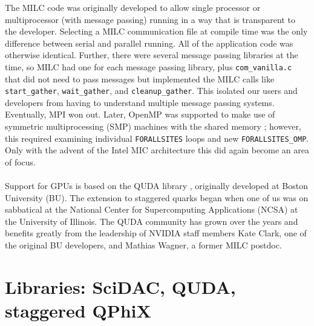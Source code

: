 \documentclass[epj]{webofc}
\begin{document}
The MILC code was originally developed to allow single processor or
multiprocessor (with message passing) running in a way that is transparent
to the developer.  Selecting a MILC communication file at compile time
was the only difference between serial and parallel running.  All of
the application code was otherwise identical.  Further, there were several
message passing libraries at the time, so MILC had one for each message
passing library, plus {\tt com\_vanilla.c} that did not need to pass messages
but implemented the MILC calls like {\tt start\_gather}, {\tt wait\_gather}, and 
{\tt cleanup\_gather}.  This isolated our users and developers from having to
understand multiple message passing systems.  Eventually, MPI won out.
Later, OpenMP was supported to make use of 
symmetric multiprocessing (SMP) machines with the shared memory \cite{MILCwMPI}; 
however, this required examining individual {\tt FORALLSITES} loops and new
{\tt FORALLSITES\_OMP}.  Only with the advent of the Intel MIC architecture
this did again become an area of focus.\\
\\
Support for GPUs is based on the QUDA library \cite{QUDA}, originally developed at
Boston University (BU).  The extension to staggered quarks began when one of us
was on sabbatical at the National Center for Supercomputing Applications
(NCSA) at the University of Illinois.  The QUDA community has grown over 
the years and benefits greatly from the leadership of NVIDIA
staff members Kate Clark, one of the original BU developers, and Mathias Wagner,
a former MILC postdoc.


\section{Libraries: SciDAC, QUDA, staggered QPhiX}\label{sec-1}
\end{document}
